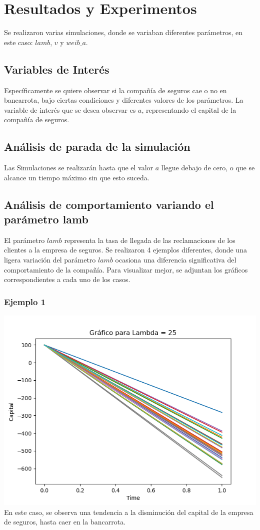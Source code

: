\documentclass{article}
\begin{document}
 \section{Resultados y Experimentos}
 Se realizaron varias simulaciones, donde se variaban diferentes parámetros, en este caso: $lamb$, $v$ y $weib\_a$. 
 \subsection{Variables de Interés}
 Específicamente se quiere observar si la compañía de seguros cae o no en bancarrota, bajo ciertas condiciones y diferentes valores de los parámetros. La variable de interés que se desea observar es $a$, representando el capital de la compañía de seguros.

 \subsection{Análisis de parada de la simulación}
Las Simulaciones se realizarán hasta que el valor $a$ llegue debajo de cero, o que se alcance un tiempo máximo sin que esto suceda. 

 \subsection{Análisis de comportamiento variando el parámetro lamb}
 El parámetro $lamb$ representa la tasa de llegada de las reclamaciones de los clientes a la empresa de seguros. Se realizaron 4 ejemplos diferentes, donde una ligera variación del parámetro $lamb$ ocasiona una diferencia significativa del comportamiento de la compañía. 
 Para visualizar mejor, se adjuntan los gráficos correspondientes a cada uno de los casos.

 \subsubsection{Ejemplo 1}
 \includegraphics[scale = 0.8]{lamb1.png}
 En este caso, se observa una tendencia a la disminución del capital de la empresa de seguros, hasta caer en la bancarrota.\\
\end{document}
